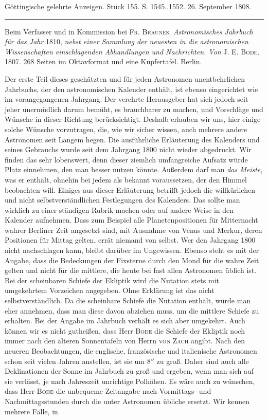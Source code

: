\clearpage
{}
\begin{center}\small Göttingische gelehrte Anzeigen. Stück 155. S. 1545..1552. 26. September 1808.\\[3pt]\rule{.72\linewidth}{.3pt}\end{center}

Beim Verfasser und in Kommission bei \textsc{Fr. Braunes}. \emph{Astronomisches Jahrbuch für das Jahr} 1810, \emph{nebst einer Sammlung der neuesten in die astronomischen Wissenschaften einschlagenden Abhandlungen und Nachrichten. Von} \textsc{J. E. Bode}. 1807. 268 Seiten im Oktavformat und eine Kupfertafel. Berlin.

Der erste Teil dieses geschätzten und für jeden Astronomen unentbehrlichen Jahrbuchs, der den astronomischen Kalender enthält, ist ebenso eingerichtet wie im vorangegangenen Jahrgang. Der verehrte Herausgeber hat sich jedoch seit jeher unermüdlich darum bemüht, es brauchbarer zu machen, und Vorschläge und Wünsche in dieser Richtung berücksichtigt. Deshalb erlauben wir uns, hier einige solche Wünsche vorzutragen, die, wie wir sicher wissen, auch mehrere andere Astronomen seit Langem hegen. Die ausführliche Erläuterung des Kalenders und seines Gebrauchs wurde seit dem Jahrgang 1800 nicht wieder abgedruckt. Wir finden das sehr lobenswert, denn dieser ziemlich umfangreiche Aufsatz würde Platz einnehmen, den man besser nutzen könnte. Außerdem darf man \emph{das Meiste}, was er enthält, ohnehin bei jedem als bekannt voraussetzen, der den Himmel beobachten will. Einiges aus dieser Erläuterung betrifft jedoch die willkürlichen und nicht selbstverständlichen Festlegungen des Kalenders. Das sollte man wirklich zu einer ständigen Rubrik machen oder auf andere Weise in den Kalender aufnehmen. Dass zum Beispiel alle Planetenpositionen für Mitternacht wahrer Berliner Zeit angesetzt sind, mit Ausnahme von Venus und Merkur, deren Positionen für Mittag gelten, errät niemand von selbst. Wer den Jahrgang 1800 nicht nachschlagen kann, bleibt darüber im Ungewissen. Ebenso steht es mit der Angabe, dass die Bedeckungen der Fixsterne durch den Mond für die wahre Zeit gelten und nicht für die mittlere, die heute bei fast allen Astronomen üblich ist. Bei der scheinbaren Schiefe der Ekliptik wird die Nutation stets mit umgekehrtem Vorzeichen angegeben. Ohne Erklärung ist das nicht selbstverständlich. Da die scheinbare Schiefe die Nutation enthält, würde man eher annehmen, dass man diese davon abziehen muss, um die mittlere Schiefe zu erhalten. Bei der Angabe im Jahrbuch verhält es sich aber umgekehrt. Auch können wir es nicht gutheißen, dass Herr \textsc{Bode} die Schiefe der Ekliptik noch immer nach den älteren Sonnentafeln von Herrn \textsc{von Zach} angibt. Nach den neueren Beobachtungen, die englische, französische und italienische Astronomen schon seit vielen Jahren anstellen, ist sie um $8''$ zu groß. Daher sind auch alle Deklinationen der Sonne im Jahrbuch zu groß und ergeben, wenn man sich auf sie verlässt, je nach Jahreszeit unrichtige Polhöhen. Es wäre auch zu wünschen, dass Herr \textsc{Bode} die unbequeme Zeitangabe nach Vormittags- und Nachmittagsstunden durch die unter Astronomen übliche ersetzt. Wir kennen mehrere Fälle, in 